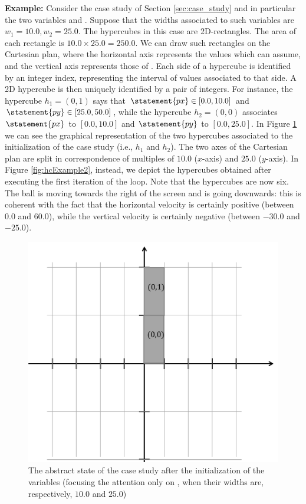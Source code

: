 \textbf{Example:} Consider the case study of Section \ref{sec:case_study} and in particular the two variables  and . Suppose that the widths associated to such variables are $w_1 = 10.0, w_2 = 25.0$. The hypercubes in this case are 2D-rectangles. The area of each rectangle is $10.0 \times 25.0 = 250.0$. We can draw such rectangles on the Cartesian plan, where the horizontal axis represents the values which  can assume, and the vertical axis represents those of . Each side of a hypercube is identified by an integer index, representing the interval of values associated to that side. A 2D hypercube is then uniquely identified by a pair of integers. For instance, the hypercube $h_1 = ( 0, 1 )$ says that $\statement{px} \in [0.0, 10.0]$ and $\statement{py} \in [25.0, 50.0]$, while the hypercube $h_2 = ( 0, 0 )$  associates $\statement{px}$ to $[0.0, 10.0]$ and $\statement{py}$ to $[0.0, 25.0]$. In Figure \ref{fig:hcExample} we can see the graphical representation of the two hypercubes associated to the initialization of the case study (i.e., $h_1$ and $h_2$). The two axes of the Cartesian plan are split in correspondence of multiples of $10.0$ ($x$-axis) and $25.0$ ($y$-axis). In Figure \ref{fig:hcExample2}, instead, we depict the hypercubes obtained after executing the first iteration of the  loop. Note that the hypercubes are now six. The ball is moving towards the right of the screen and is going downwards: this is coherent with the fact that the horizontal velocity is certainly positive (between $0.0$ and $60.0$), while the vertical velocity is certainly negative (between $-30.0$ and $-25.0$). 

\begin{figure}[ht]
\begin{centering}
\includegraphics[scale=0.35]{Pics/example_hc_2d.png}
\caption{The abstract state of the case study after the initialization of the variables (focusing the attention only on , when their widths are, respectively, $10.0$ and $25.0$)}
\label{fig:hcExample}
\end{centering}
\end{figure}

